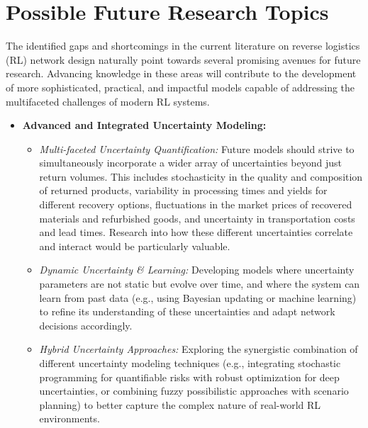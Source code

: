 \section{Possible Future Research Topics}

The identified gaps and shortcomings in the current literature on reverse logistics (RL) network design naturally point towards several promising avenues for future research. Advancing knowledge in these areas will contribute to the development of more sophisticated, practical, and impactful models capable of addressing the multifaceted challenges of modern RL systems.

\begin{itemize}
    \item \textbf{Advanced and Integrated Uncertainty Modeling:}
        \begin{itemize}
            \item \textit{Multi-faceted Uncertainty Quantification:} Future models should strive to simultaneously incorporate a wider array of uncertainties beyond just return volumes. This includes stochasticity in the quality and composition of returned products, variability in processing times and yields for different recovery options, fluctuations in the market prices of recovered materials and refurbished goods, and uncertainty in transportation costs and lead times. Research into how these different uncertainties correlate and interact would be particularly valuable.
            \item \textit{Dynamic Uncertainty \& Learning:} Developing models where uncertainty parameters are not static but evolve over time, and where the system can learn from past data (e.g., using Bayesian updating or machine learning) to refine its understanding of these uncertainties and adapt network decisions accordingly.
            \item \textit{Hybrid Uncertainty Approaches:} Exploring the synergistic combination of different uncertainty modeling techniques (e.g., integrating stochastic programming for quantifiable risks with robust optimization for deep uncertainties, or combining fuzzy possibilistic approaches with scenario planning) to better capture the complex nature of real-world RL environments.
        \end{itemize}


\end{itemize}
